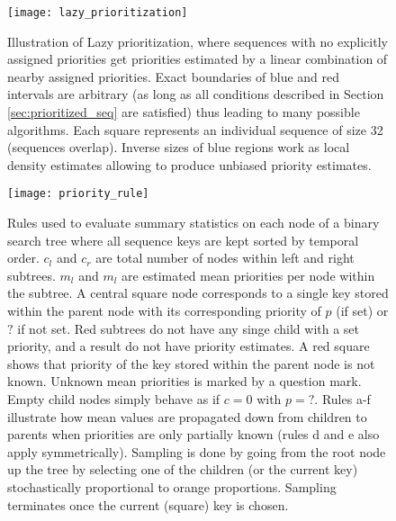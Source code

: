 \documentclass{article}
\begin{document}
\begin{figure}
\centering
\begin{minipage}{1.0\textwidth}  
  \centering
  \texttt{[image: lazy\_prioritization]}
  \caption{Illustration of Lazy prioritization, where sequences with no 
    explicitly assigned priorities get priorities estimated by a linear 
    combination of nearby assigned priorities. Exact boundaries of blue 
    and red intervals are arbitrary (as long as all conditions described in 
    Section \ref{sec:prioritized_seq} are satisfied) thus leading to many 
    possible algorithms. Each square represents an individual sequence of 
    size 32 (sequences overlap).
    Inverse sizes of blue regions work as local density estimates allowing to 
    produce unbiased priority estimates.}
  \label{lazy-prioritization}
\end{minipage}\end{figure}


\begin{figure}
\centering
\begin{minipage}{1.0\textwidth}  
  \centering
  \texttt{[image: priority\_rule]}
  \caption{Rules used to evaluate summary statistics on each node of a binary 
    search tree where all sequence keys are kept sorted by temporal order. 
    $c_l$ and $c_r$ are total number of nodes within left and right subtrees. 
    $m_l$ and $m_l$ are estimated mean priorities per node within the subtree. 
    A central square node corresponds to a single key stored within the parent 
    node with its corresponding priority of $p$ (if set) or $?$ if not set. 
    Red subtrees do not have any singe child with a set priority, and a result 
    do not have priority estimates. A red square shows that priority of the key 
    stored within the parent node is not known. Unknown mean priorities is 
    marked by a question mark. Empty child nodes simply behave as if $c=0$ with 
    $p=?$. Rules a-f illustrate how mean values are propagated down from 
    children to parents when priorities are only partially known (rules d and e 
    also apply symmetrically). Sampling is done by going from the root node up 
    the tree by selecting one of the children (or the current key) 
    stochastically proportional to orange proportions. Sampling terminates once 
    the current (square) key is chosen.}
  \label{priority-rule}
\end{minipage}\end{figure}
\end{document}
